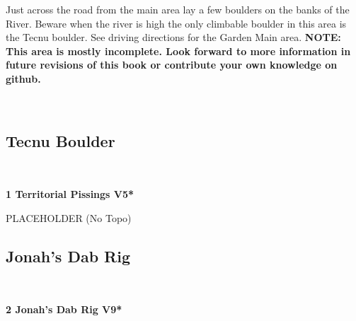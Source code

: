 \raggedcolumns
\begin{multicols}{2}
Just across the road from the main area lay a few boulders on the banks of the River. Beware when the river is high the only climbable boulder in this area is the Tecnu boulder. See driving directions for the Garden Main area.
\newline
\textbf{NOTE: This area is mostly incomplete. Look forward to more information in future revisions of this book or contribute your own knowledge on github.}

\newpage
	\begin{minipage}{\columnwidth}
	\
	\end{minipage}
	
			\begin{minipage}{\columnwidth}
			\subsection*{Tecnu Boulder}\label{bf:Tecnu Boulder}
			\
			
			\end{minipage}
			
					\begin{minipage}{\linewidth}	
					\label{rt:Territorial Pissings}
\colorbox{RoyalBlue!20}{
\parbox{0.95\textwidth}{
\textbf{
1 Territorial Pissings V5*  
}
}
}

					\begin{adjustwidth}{0.5cm}{}				
					PLACEHOLDER
						\newline (No Topo) 
					\end{adjustwidth}
					\end{minipage}
			\begin{minipage}{\columnwidth}
			\subsection*{Jonah's Dab Rig}\label{bf:Jonah's Dab Rig}
			\
			
			\end{minipage}
			
					\begin{minipage}{\linewidth}	
					\label{rt:Jonah's Dab Rig}
\colorbox{Goldenrod!50}{
\parbox{0.95\textwidth}{
\textbf{
2 Jonah's Dab Rig V9*  
}
}
}


\end{minipage}
\end{multicols}
